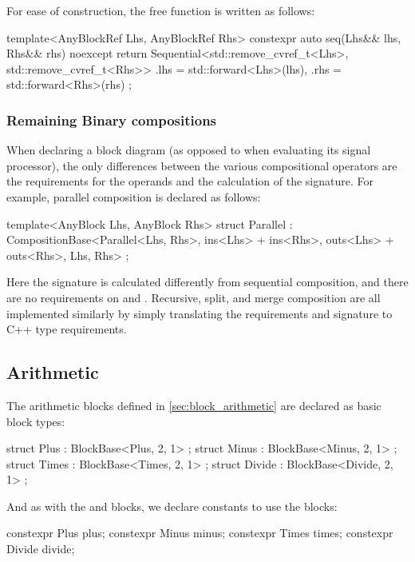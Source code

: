 For ease of construction, the free function  is written as follows:

\begin{cppcodenl}
  template<AnyBlockRef Lhs, AnyBlockRef Rhs>
  constexpr auto seq(Lhs&& lhs, Rhs&& rhs) noexcept
  {
    return Sequential<std::remove_cvref_t<Lhs>, std::remove_cvref_t<Rhs>>{
      .lhs = std::forward<Lhs>(lhs),
      .rhs = std::forward<Rhs>(rhs)
    };
  }
\end{cppcodenl}

\subsubsection{Remaining Binary compositions}

When declaring a block diagram (as opposed to when evaluating its signal processor), the only differences
between the various compositional operators are the requirements for the operands and the calculation of the
signature. For example, parallel composition is declared as follows:

\begin{cppcodenl}
  template<AnyBlock Lhs, AnyBlock Rhs>
  struct Parallel : CompositionBase<Parallel<Lhs, Rhs>, ins<Lhs> + ins<Rhs>, outs<Lhs> + outs<Rhs>, Lhs, Rhs> {};
\end{cppcodenl}

Here the signature is calculated differently from sequential composition, and there are no requirements on
 and . Recursive, split, and merge composition are all
implemented similarly by simply translating the requirements and signature to C++ type requirements.

\subsection{Arithmetic}

The arithmetic blocks defined in \autoref{sec:block_arithmetic} are declared as basic block types:

\begin{cppcodenl}
  struct Plus : BlockBase<Plus, 2, 1> {};
  struct Minus : BlockBase<Minus, 2, 1> {};
  struct Times : BlockBase<Times, 2, 1> {};
  struct Divide : BlockBase<Divide, 2, 1> {};
\end{cppcodenl}

And as with the \Ident and \Cut blocks, we declare constants to use the blocks:
\begin{cppcodenl}
  constexpr Plus plus;
  constexpr Minus minus;
  constexpr Times times;
  constexpr Divide divide;
\end{cppcodenl}

